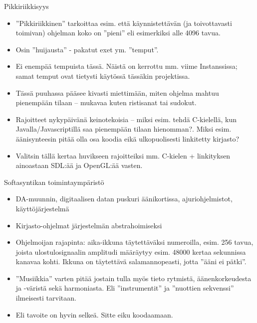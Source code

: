 \documentclass{beamer}
\begin{document}
\begin{frame}{Pikkiriikkisyys}
\begin{itemize}
\item ''Pikkiriikkinen'' tarkoittaa esim. että käynnistettävän (ja
  toivottavasti toimivan) ohjelman koko on ''pieni'' eli esimerkiksi
  alle 4096 tavua.
\item Osin ''huijausta'' - pakatut exet ym. ''temput''.
\item Ei enempää tempuista tässä. Näistä on kerrottu mm. viime
  Instanssissa; samat temput ovat tietysti käytössä tässäkin
  projektissa.
\item Tässä puuhassa pääsee kivasti miettimään, miten ohjelma mahtuu
  pienempään tilaan -- mukavaa kuten ristisanat tai sudokut.
\item Rajoitteet nykypäivänä keinotekoisia -- miksi esim. tehdä
  C-kielellä, kun Javalla/Javascriptillä saa pienempään tilaan
  hienomman?. Miksi esim. äänisynteesin pitää olla osa koodia eikä
  ulkopuolisesti linkitetty kirjasto?
\item Valitsin tällä kertaa huvikseen rajoitteiksi mm. C-kielen +
  linkityksen ainoastaan SDL:ää ja OpenGL:ää vasten.
\end{itemize}
\end{frame}

\begin{frame}{Softasyntikan toimintaympäristö}
  \begin{itemize}
  \item DA-muunnin, digitaalisen datan puskuri äänikortissa,
    ajuriohjelmistot, käyttöjärjestelmä
  \item Kirjasto-ohjelmat järjestelmän abstrahoimiseksi
  \item Ohjelmoijan rajapinta: aika-ikkuna täytettäväksi numeroilla,
    esim. 256 tavua, joista ulostulosignaalin amplitudi määräytyy
    esim. 48000 kertaa sekunnissa kanavaa kohti. Ikkuna on täytettävä
    salamannopeasti, jotta ''ääni ei pätki''.
  \item ''Musiikkia'' varten pitää jostain tulla myös tieto rytmistä,
    äänenkorkeudesta ja -väristä sekä harmoniasta. Eli
    ''instrumentit'' ja ''nuottien sekvenssi'' ilmeisesti tarvitaan.
  \item Eli tavoite on hyvin selkeä. Sitte eiku koodaamaan.
  \end{itemize}
\end{frame}
\end{document}
